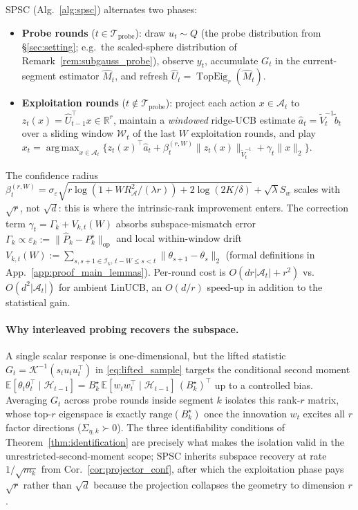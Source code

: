 \documentclass{article}
\newcommand{\R}{\mathbb{R}}
\newcommand{\E}{\mathbb{E}}
\newcommand{\op}{\mathrm{op}}
\newcommand{\cA}{\mathcal{A}}
\newcommand{\cH}{\mathcal{H}}
\newcommand{\cI}{\mathcal{I}}
\newcommand{\cW}{\mathcal{W}}
\newcommand{\cTprobe}{\mathcal{T}_{\mathrm{probe}}}
\newcommand{\range}{\mathrm{range}}
\DeclareMathOperator{\TopEig}{TopEig}
\DeclareMathOperator*{\argmax}{arg\,max}
\begin{document}
SPSC (Alg.~\ref{alg:spsc}) alternates two phases:
\begin{itemize}[leftmargin=1.5em,nosep]
\item \textbf{Probe rounds} ($t\in\cTprobe$): draw $u_t\sim Q$ (the
probe distribution from \S\ref{sec:setting}; e.g.\ the scaled-sphere
distribution of Remark~\ref{rem:subgauss_probe}), observe $y_t$,
accumulate $G_t$ in the current-segment estimator $\widehat M_t$,
and refresh $\widehat U_t = \TopEig_r(\widehat M_t)$.
\item \textbf{Exploitation rounds} ($t\notin\cTprobe$): project each
action $x\in\cA_t$ to $z_t(x) = \widehat U_{t-1}^\top x\in\R^r$, maintain a
\emph{windowed} ridge-UCB estimate
$\widehat a_t = \widetilde V_t^{-1}\widetilde b_t$ over a sliding
window $\cW_t$ of the last $W$ exploitation rounds, and play
$x_t = \argmax_{x\in\cA_t}
\bigl\{ z_t(x)^\top\widehat a_t + \beta_t^{(r,W)}\|z_t(x)\|_{\widetilde V_t^{-1}}
+ \gamma_t \|x\|_2 \bigr\}$.
\end{itemize}
The confidence radius
$\beta_t^{(r,W)}=\sigma_\varepsilon\sqrt{r\log(1+WR_\cA^2/(\lambda r))
+2\log(2K/\delta)}+\sqrt{\lambda}S_w$
scales with $\sqrt{r}$, not $\sqrt{d}$: this is where the intrinsic-rank
improvement enters. The correction term
$\gamma_t = \Gamma_k + V_{k,t}(W)$
absorbs subspace-mismatch error
$\Gamma_k\propto\varepsilon_k:=\|\widehat P_k - P_k^\star\|_{\op}$
and local within-window drift
$V_{k,t}(W):=\sum_{s,s+1\in\cI_k,\,t-W\le s<t}\|\theta_{s+1}-\theta_s\|_2$
(formal definitions in App.~\ref{app:proof_main_lemmas}). Per-round cost is $O(dr|\cA_t|+r^2)$ vs.\
$O(d^2|\cA_t|)$ for ambient LinUCB, an $O(d/r)$ speed-up in addition
to the statistical gain.

\paragraph{Why interleaved probing recovers the subspace.}
A single scalar response is one-dimensional, but the lifted statistic
$G_t=\mathcal K^{-1}(s_t u_tu_t^\top)$ in
\eqref{eq:lifted_sample} targets the conditional second moment
$\E[\theta_t\theta_t^\top\mid\cH_{t-1}]
= B_k^\star\,\E[w_tw_t^\top\mid\cH_{t-1}]\,(B_k^\star)^\top$ up to a
controlled bias. Averaging $G_t$ across probe rounds inside segment
$k$ isolates this rank-$r$ matrix, whose top-$r$ eigenspace is
exactly $\range(B_k^\star)$ once the innovation $w_t$ excites all
$r$ factor directions ($\Sigma_{\eta,k}\succ 0$). The three
identifiability conditions of Theorem~\ref{thm:identification} are
precisely what makes the isolation valid in the
unrestricted-second-moment scope; SPSC inherits subspace recovery at
rate $1/\sqrt{m_k}$ from Cor.~\ref{cor:projector_conf}, after which
the exploitation phase pays $\sqrt r$ rather than $\sqrt d$ because
the projection collapses the geometry to dimension $r$.
\end{document}
